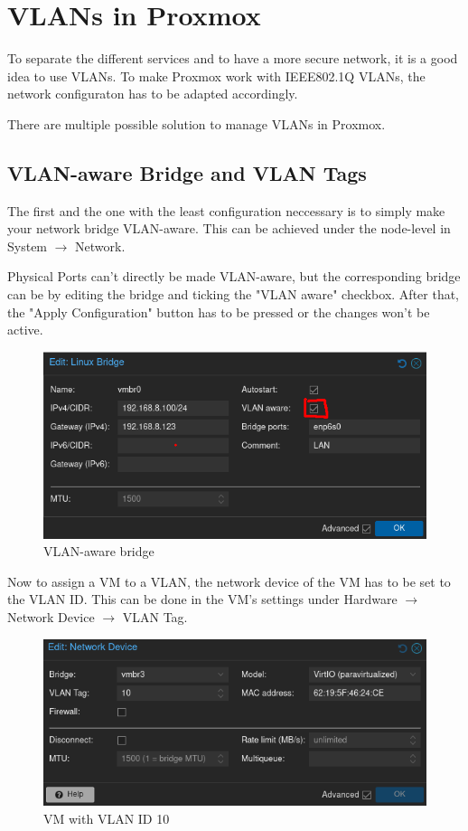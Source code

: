 \section{VLANs in Proxmox}

To separate the different services and to have a more secure network, it is a good idea to use VLANs. To make Proxmox work with IEEE802.1Q VLANs, the network configuraton has to be adapted accordingly.

There are multiple possible solution to manage VLANs in Proxmox. 
\subsection{VLAN-aware Bridge and VLAN Tags}
The first and the one with the least configuration neccessary is to simply make your network bridge VLAN-aware. This can be achieved under the node-level in System $\rightarrow$ Network. 

Physical Ports can't directly be made VLAN-aware, but the corresponding bridge can be by editing the bridge and ticking the "VLAN aware" checkbox. After that, the "Apply Configuration" button has to be pressed or the changes won't be active. 
\begin{figure}[H]
	\centering
	\includegraphics[width=0.8\linewidth]{Figures/vlan-aware-bridge.png}
	\caption{VLAN-aware bridge}
\end{figure}

Now to assign a VM to a VLAN, the network device of the VM has to be set to the VLAN ID. This can be done in the VM's settings under Hardware $\rightarrow$ Network Device $\rightarrow$ VLAN Tag.

\begin{figure}[H]
	\centering
	\includegraphics[width=0.8\linewidth]{Figures/vm-vlan-10.png}
	\caption{VM with VLAN ID 10}
\end{figure}

